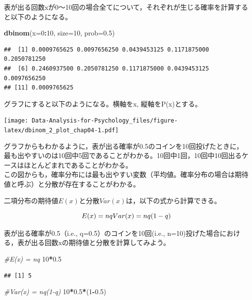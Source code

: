 \documentclass[]{article}
\newenvironment{Shaded}{\begin{snugshade}}{\end{snugshade}}
\newcommand{\KeywordTok}[1]{\textcolor[rgb]{0.13,0.29,0.53}{\textbf{#1}}}
\newcommand{\DataTypeTok}[1]{\textcolor[rgb]{0.13,0.29,0.53}{#1}}
\newcommand{\DecValTok}[1]{\textcolor[rgb]{0.00,0.00,0.81}{#1}}
\newcommand{\FloatTok}[1]{\textcolor[rgb]{0.00,0.00,0.81}{#1}}
\newcommand{\CommentTok}[1]{\textcolor[rgb]{0.56,0.35,0.01}{\textit{#1}}}
\newcommand{\OperatorTok}[1]{\textcolor[rgb]{0.81,0.36,0.00}{\textbf{#1}}}
\newcommand{\NormalTok}[1]{#1}
\begin{document}
表が出る回数xが0〜10回の場合全てについて，それぞれが生じる確率を計算すると以下のようになる。

\begin{Shaded}
\begin{Highlighting}[]
\KeywordTok{dbinom}\NormalTok{(}\DataTypeTok{x=}\DecValTok{0}\OperatorTok{:}\DecValTok{10}\NormalTok{, }\DataTypeTok{size=}\DecValTok{10}\NormalTok{, }\DataTypeTok{prob=}\FloatTok{0.5}\NormalTok{)}
\end{Highlighting}
\end{Shaded}

\begin{verbatim}
##  [1] 0.0009765625 0.0097656250 0.0439453125 0.1171875000 0.2050781250
##  [6] 0.2460937500 0.2050781250 0.1171875000 0.0439453125 0.0097656250
## [11] 0.0009765625
\end{verbatim}

グラフにすると以下のようになる。横軸をx, 縦軸をP(x)とする。

\texttt{[image: Data-Analysis-for-Psychology\_files/figure-latex/dbinom\_2\_plot\_chap04-1.pdf]}

グラフからもわかるように，表が出る確率が0.5のコインを10回投げたときに，最も出やすいのは10回中5回であることがわかる。10回中1回，10回中10回出るケースはほとんどまれであることがわかる。\\
この図からも，確率分布には最も出やすい変数（平均値。確率分布の場合は期待値と呼ぶ）と分散が存在することがわかる。

二項分布の期待値\(E(x)\)と分散\(Var(x)\)は，以下の式から計算できる。

\[
E(x) = nq\\
Var(x) = nq(1-q)
\]

表が出る確率が0.5（i.e., q=0.5）のコインを10回(i.e.,
n=10)投げた場合における，表が出る回数xの期待値と分散を計算してみよう。

\begin{Shaded}
\begin{Highlighting}[]
\CommentTok{#E(x) = nq}
\DecValTok{10}\OperatorTok{*}\FloatTok{0.5}
\end{Highlighting}
\end{Shaded}

\begin{verbatim}
## [1] 5
\end{verbatim}

\begin{Shaded}
\begin{Highlighting}[]
\CommentTok{#Var(x) = nq(1-q)}
\DecValTok{10}\OperatorTok{*}\FloatTok{0.5}\OperatorTok{*}\NormalTok{(}\DecValTok{1}\OperatorTok{-}\FloatTok{0.5}\NormalTok{)}
\end{Highlighting}
\end{Shaded}
\end{document}
